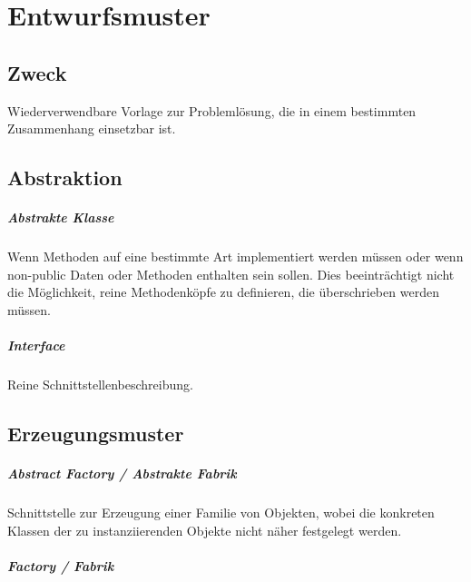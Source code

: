 \chapter{Entwurfsmuster}\label{entwurfsmuster}

\section{Zweck}\label{zweck}
Wiederverwendbare Vorlage zur Problemlösung, die in einem bestimmten
Zusammenhang einsetzbar ist.

\section{Abstraktion}\label{abstraktion}

\paragraph{Abstrakte Klasse}\label{abstrakte-klasse}

Wenn Methoden auf eine bestimmte Art implementiert werden müssen oder
wenn non-public Daten oder Methoden enthalten sein sollen. Dies
beeinträchtigt nicht die Möglichkeit, reine Methodenköpfe zu definieren,
die überschrieben werden müssen.

\paragraph{Interface}\label{interface}

Reine Schnittstellenbeschreibung.

\section{Erzeugungsmuster}\label{erzeugungsmuster}

\paragraph{Abstract Factory / Abstrakte Fabrik}\label{abstract-factory}

Schnittstelle zur Erzeugung einer Familie von Objekten, wobei die konkreten
Klassen der zu instanziierenden Objekte nicht näher festgelegt werden.

\paragraph{Factory / Fabrik}\label{factory}

